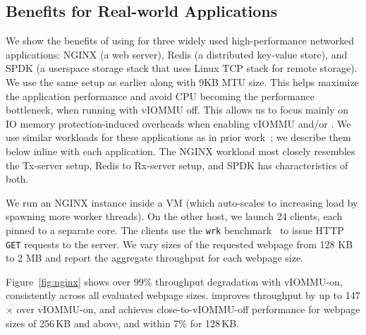 \subsection{{\name} Benefits for Real-world Applications}
\label{ssec:real-world}
We show the benefits of using {\name} for three widely used high-performance 
    networked applications: 
    NGINX (a web server), 
    Redis (a distributed key-value store), 
    and SPDK (a userspace storage stack that uses Linux TCP stack for remote storage).
We use the same setup as earlier along with $9$KB MTU size. This helps maximize the application performance and avoid CPU becoming the performance bottleneck, when running with vIOMMU off. This allows us to focus mainly on IO memory protection-induced overheads when enabling vIOMMU and/or {\name}. 
We use similar workloads for these applications as in prior work~\cite{Rubin2024FastSafe}; we describe them below inline with each application.  The NGINX workload most closely resembles the Tx-server setup, Redis to Rx-server setup, and SPDK has characteristics of both. 

We run an NGINX instance inside a VM (which auto-scales to increasing load by spawning more worker threads). 
On the other host, we launch 24 clients, each pinned to a separate core. 
The clients use the \texttt{wrk} benchmark~\cite{wrk} to issue HTTP \texttt{GET} requests to the server.
We vary sizes of the requested webpage from 128 KB to 2 MB and report the aggregate throughput for each webpage size.

Figure~\ref{fig:nginx} shows over {$99\%$} throughput degradation with vIOMMU-on, 
    consistently across all evaluated webpage sizes.
\brand improves throughput by up to 147$\times$ over vIOMMU-on,
    and achieves close-to-vIOMMU-off performance for webpage sizes of 256\,KB and above, and within 7\% for 128\,KB.

